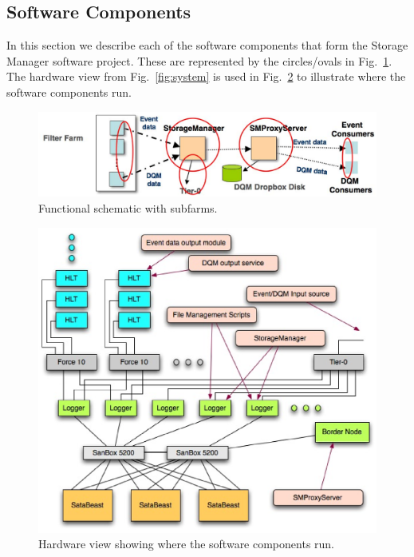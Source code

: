 \subsection{Software Components}

In this section we describe each of the software components that form the
Storage Manager software project. These are represented by the circles/ovals in
Fig.~\ref{fig:schematic_wproxy}. The hardware view from 
Fig.~\ref{fig:system} is used in Fig.~\ref{fig:sm_hardware_wsoftware}
to illustrate where the software components run.

\begin{figure}[hbtp]
  \begin{center}
    \includegraphics[width=5.5in]{Software/schematic_wproxy.eps}
    \caption{Functional schematic with subfarms.}
    \label{fig:schematic_wproxy}
  \end{center}
\end{figure}

\begin{figure}[hbtp]
  \begin{center}
    \includegraphics[width=4.5in]{Software/sm_hardware.eps}
    \caption{Hardware view showing where the software components run.}
    \label{fig:sm_hardware_wsoftware}
  \end{center}
\end{figure}

